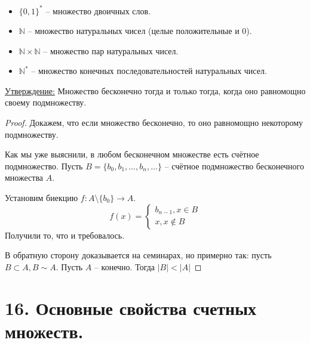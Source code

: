 \documentclass[a4paper, 12pt]{article}
\newcommand{\statement}{\underline{Утверждение:} }
\newcommand{\N}{\mathbb{N}}
\begin{document}
\begin{itemize}
        \item $\{ 0, 1\}^*$ -- множество двоичных слов.
        \item $\N$ -- множество натуральных чисел (целые положительные и 0).
        \item $\N \times \N$ -- множество пар натуральных чисел.
        \item $\N^*$ -- множество конечных последовательностей натуральных чисел.
\end{itemize}

\statement Множество бесконечно тогда и только тогда, когда оно равномощно 
своему подмножеству.
\begin{proof}
    Докажем, что если множество бесконечно, то оно равномощно некоторому подмножеству.

    Как мы уже выяснили, в любом бесконечном множестве есть счётное подмножество.
    Пусть $B = \{b_0, b_1, \ldots, b_n, \ldots\}$ -- счётное подмножество
    бесконечного множества $A$.

    Установим биекцию $f: A \setminus \{b_0\} \to A$.
    \[
    f(x) = \begin{cases}
        b_{n-1}, x \in B \\
        x, x \notin B
    \end{cases}
    \]
    Получили то, что и требовалось.

    В обратную сторону доказывается на семинарах, но примерно так:
    пусть $B \subset A, B \sim A$. Пусть $A$ -- конечно. Тогда $|B| < |A|$
\end{proof}

\section*{16. Основные свойства счетных множеств.}
\end{document}
